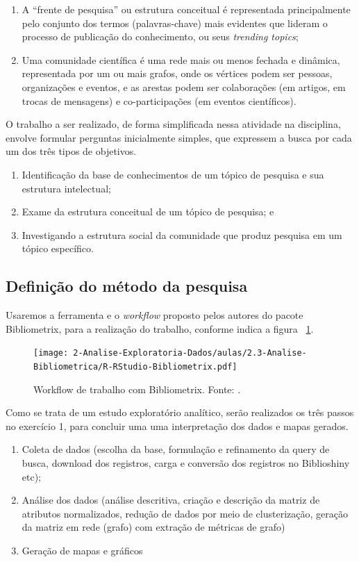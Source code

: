 \begin{enumerate}
    \item A ``frente de pesquisa'' ou estrutura conceitual é representada principalmente pelo conjunto dos termos (palavras-chave) mais evidentes que lideram o processo de publicação do conhecimento, ou seus \textit{trending topics};
    \item Uma comunidade científica é uma rede mais ou menos fechada e dinâmica, representada por um ou mais grafos, onde os vértices podem ser pessoas, organizações e eventos, e as arestas podem ser colaborações (em artigos, em trocas de mensagens) e co-participações (em eventos científicos).
\end{enumerate}

O trabalho a ser realizado, de forma simplificada nessa atividade na disciplina, envolve  formular perguntas inicialmente simples, que expressem a busca por cada um dos três tipos de objetivos.

\begin{enumerate}
\item Identificação da base de conhecimentos de um tópico de pesquisa e sua estrutura intelectual;

\item Exame da estrutura conceitual de um tópico de pesquisa; e

\item Investigando a estrutura social da comunidade que produz pesquisa em um tópico específico.
\end{enumerate}

\subsection{Definição do método da pesquisa}

Usaremos a ferramenta e o \textit{workflow} proposto pelos autores do pacote Bibliometrix, para a realização do trabalho, conforme indica a figura ~\ref{fig:bibliometrix:workflow}.

\begin{figure}
    \centering
\texttt{[image: 2-Analise-Exploratoria-Dados/aulas/2.3-Analise-Bibliometrica/R-RStudio-Bibliometrix.pdf]}
    \caption{Workflow de trabalho com Bibliometrix. Fonte: \citep{aria_bibliometrix_2017}.\label{fig:bibliometrix:workflow}}
    
\end{figure}

Como se trata de um estudo exploratório analítico, serão realizados os três passos no exercício 1, para concluir uma uma interpretação dos dados e mapas gerados.
\begin{enumerate}
    \item Coleta de dados (escolha da base, formulação e refinamento da query de busca, download dos registros, carga e conversão dos registros no Biblioshiny etc);
    \item Análise dos dados (análise descritiva, criação e descrição da matriz de atributos normalizados, redução de dados por meio de clusterização, geração da matriz em rede (grafo) com extração de métricas de grafo)
    \item Geração de mapas e gráficos
\end{enumerate}

